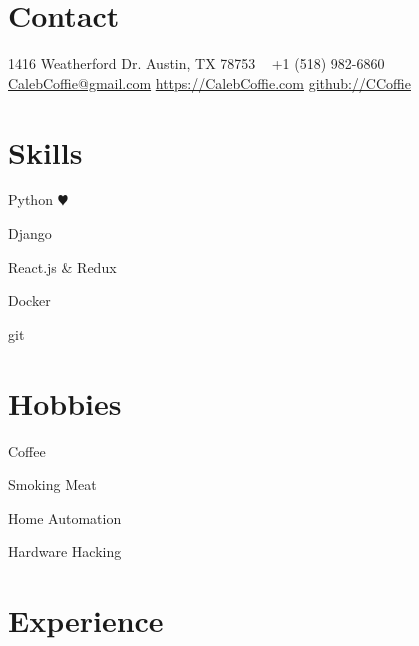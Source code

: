 \documentclass[]{CalebCoffie-CV-Class} %
\begin{document}


\begin{aside} %
\section{Contact}
1416 Weatherford Dr.
Austin, TX 78753
~
+1 (518) 982-6860
~
\href{mailto:CalebCoffie@gmail.com}{CalebCoffie@gmail.com}
\href{https://CalebCoffie.com}{https://CalebCoffie.com}
\href{https://github.com/CCoffie}{github://CCoffie}
\section{Skills}
\item Python {\color{black} $\varheartsuit$}
\item Django
\item React.js \& Redux
\item Docker
\item git
\section{Hobbies}
\item Coffee
\item Smoking Meat
\item Home Automation
\item Hardware Hacking
\end{aside}


\section{Experience}
\end{document}
